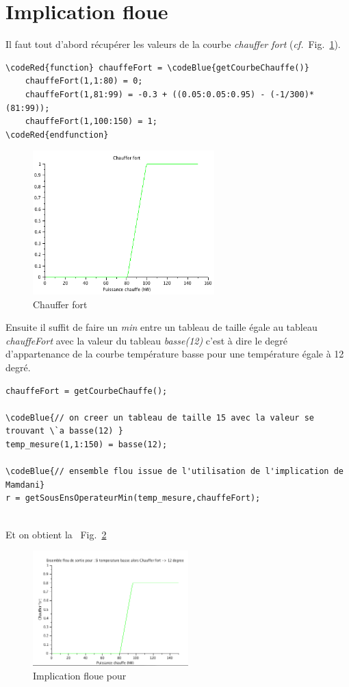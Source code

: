 \documentclass[a4paper,10pt]{article}
\begin{document}
\section{Implication floue}

Il faut tout d'abord r\'ecup\'erer les valeurs de la courbe \emph{chauffer fort} (\emph{cf.}~Fig.~\ref{chauffer_fort}). 

\begin{Verbatim}[commandchars=\\\{\}]
\codeRed{function} chauffeFort = \codeBlue{getCourbeChauffe()}
    chauffeFort(1,1:80) = 0;
    chauffeFort(1,81:99) = -0.3 + ((0.05:0.05:0.95) - (-1/300)*(81:99));
    chauffeFort(1,100:150) = 1;
\codeRed{endfunction}
\end{Verbatim}

\begin{figure}[ht]
\begin{center}
	\includegraphics[width=7cm]{images/chauffer_fort.png}
\end{center}
	\caption{Chauffer fort}
	\label{chauffer_fort}
\end{figure}

\newpage

Ensuite il suffit de faire un \emph{min} entre un tableau de taille \'egale au tableau \emph{chauffeFort} avec la valeur du tableau \emph{basse(12)} c'est \`a dire le degr\'e d'appartenance de la courbe temp\'erature basse pour une temp\'erature \'egale \`a 12 degr\'e. \\

\begin{Verbatim}[commandchars=\\\{\}]
chauffeFort = getCourbeChauffe();

\codeBlue{// on creer un tableau de taille 15 avec la valeur se trouvant \`a basse(12) }
temp_mesure(1,1:150) = basse(12);

\codeBlue{// ensemble flou issue de l'utilisation de l'implication de Mamdani}
r = getSousEnsOperateurMin(temp_mesure,chauffeFort);
\end{Verbatim}
~\\

Et on obtient la ~Fig.~\ref{implication_floue}

\begin{figure}[ht]
\begin{center}
	\includegraphics[width=6cm]{images/implication_floue.png}
\end{center}
	\caption{Implication floue pour }
	\label{implication_floue}
\end{figure}
\end{document}

